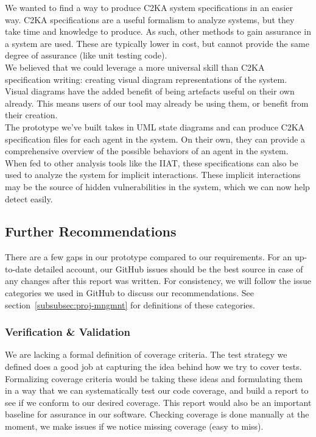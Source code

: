 We wanted to find a way to produce C2KA system specifications in an easier way.
C2KA specifications are a useful formalism to analyze systems, but they take time and knowledge to produce.
As such, other methods to gain assurance in a system are used.
These are typically lower in cost, but cannot provide the same degree of assurance (like unit testing code).\\

We believed that we could leverage a more universal skill than C2KA specification writing:
creating visual diagram representations of the system.
Visual diagrams have the added benefit of being artefacts useful on their own already.
This means users of our tool may already be using them, or benefit from their creation.\\

The prototype we've built takes in UML state diagrams and can produce C2KA specification files for each agent in the system.
On their own, they can provide a comprehensive overview of the possible behaviors of an agent in the system.
When fed to other analysis tools like the IIAT,
these specifications can also be used to analyze the system for implicit interactions.
These implicit interactions may be the source of hidden vulnerabilities in the system,
which we can now help detect easily.

\subsection{Further Recommendations}\label{subsec:further-recommendations}
There are a few gaps in our prototype compared to our requirements.
For an up-to-date detailed account, our GitHub issues should be the best source in case of any changes after this report was written.
For consistency, we will follow the issue categories we used in GitHub to discuss our recommendations.
See section~\ref{subsubsec:proj-mngmnt} for definitions of these categories.

\subsubsection{Verification \& Validation}\label{subsubsec:rec-v-v}
We are lacking a formal definition of coverage criteria.
The test strategy we defined does a good job at capturing the idea behind how we try to cover tests.
Formalizing coverage criteria would be taking these ideas and formulating them in a way that we can systematically
test our code coverage, and build a report to see if we conform to our desired coverage.
This report would also be an important baseline for assurance in our software.
Checking coverage is done manually at the moment, we make issues if we notice missing coverage (easy to miss). \\

